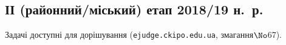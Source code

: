 \renewenvironment{problemAllDefault}[1]{\vspace{10mm}\par\begin{problem}{#1}{\stdinOrInputTxt}{\stdoutOrOutputTxt}{1 сек}{128 мегабайтів}}{\end{problem}}

\subsection{ІІ (районний/міський) етап 2018/19 н.~р.}

Задачі доступні для дорішування (\verb"ejudge.ckipo.edu.ua", змагання\nolinebreak[3] $\No$67).



	

	

\vspace{-0.5\baselineskip minus 5mm plus 2in}
\label{text:201819-2-C-start}%
	
\label{text:201819-2-C-finish}%

	

	


